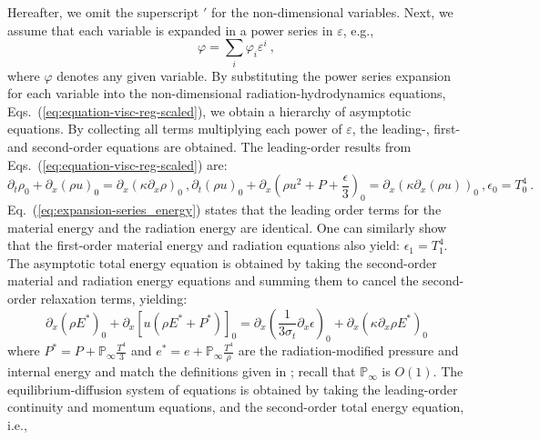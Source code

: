 \documentclass[review]{elsarticle}
\newcommand{\eqt}[1]{Eq.~(\ref{#1})}                     %
\newcommand{\eqts}[1]{Eqs.~(\ref{#1})}                     %
\renewcommand{\Re}{\textrm{Re}}
\renewcommand{\Re}{\mathbb{P}_\infty}
\begin{document}
Hereafter, we omit the superscript $'$ for the non-dimensional variables.
Next, we assume that each variable is expanded in a power series in $\varepsilon$, e.g.,
%
\begin{equation}\label{eq:expansion-series}
\varphi = \sum_i \varphi_i \varepsilon^i \ ,
\end{equation}
%
where $\varphi$ denotes any given variable. By substituting the power series expansion for each variable into the non-dimensional
radiation-hydrodynamics equations, \eqts{eq:equation-visc-reg-scaled}, we obtain a hierarchy of asymptotic equations. By collecting all terms multiplying each power of $\varepsilon$, the leading-, first- and second-order equations are obtained. The leading-order results from \eqts{eq:equation-visc-reg-scaled} are:
%
\begin{subequations}
\label{eq:first-order}
%
\begin{equation}
\partial_t \rho_0 + \partial_x \left( \rho u \right)_0 = \partial_x \left( \kappa \partial_x  \rho \right)_0  \ ,
\end{equation}
%
\begin{equation}
\partial_t \left( \rho u \right)_0 + \partial_x \left( \rho u^2 + P + \frac{\epsilon}{3}\right)_0 = \partial_x \left( \kappa \partial_x \left( \rho u \right) \right)_0  \ ,
\end{equation}
%
\begin{equation}\label{eq:expansion-series_energy}
\epsilon_0 = T_0^4  \ .
\end{equation}
%
\end{subequations}
%
%
\eqt{eq:expansion-series_energy} states that the leading order terms for the material energy and the radiation energy are identical. One can similarly show that the first-order material energy and radiation equations also yield: $\epsilon_1 = T_1^4$. The asymptotic total energy equation is obtained by taking the second-order material and radiation energy equations and summing them to cancel the second-order relaxation terms, yielding:
%
\begin{equation}
\partial_x \left( \rho E^* \right)_0 + \partial_x \left[ u \left( \rho E^* + P^* \right) \right]_0 = \partial_x \left( \frac{1}{3 \sigma_t} \partial_x \epsilon \right)_0 + \partial_x \left( \kappa \partial_x \rho E^* \right)_0
\end{equation}
%
where $P^* = P + \Re \frac{T^4}{3}$ and $e^* = e + \Re \frac{T^4}{\rho}$ are the radiation-modified pressure and internal energy and match the definitions given in \cite{LowrieMorel}; recall that $\Re$ is $O(1)$. The equilibrium-diffusion system of equations is obtained by taking the leading-order continuity and momentum equations, and the second-order total energy equation, i.e.,
\end{document}
